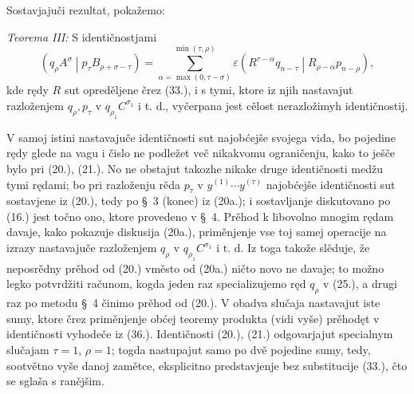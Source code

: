\documentclass[11pt]{article}
\newcommand{\pair}[2]{\left(#1\middle|#2\right)}
\newcommand{\eps}{\varepsilon}
\begin{document}
Sostavjajuči rezultat, pokažemo:

\emph{Teorema III:} S identičnostjami
\begin{equation}
 \pair{q_\rho A^\sigma}{p_\tau B_{\rho+\sigma-\tau}}
 =\sum_{\alpha=\max(0,\tau-\sigma)}^{\min(\tau,\rho)}
 \eps\pair{R^{\tau-\alpha}q_{n-\tau}}{R_{\rho-\alpha}p_{n-\rho}},
\tag{36}
\end{equation}
kde rędy $R$ sut opreděljene črez (33.), i s tymi, ktore iz njih nastavajut razloženjem $q_\rho,p_\tau$ v $q_{\rho_1}C^{\sigma_1}$ i t. d., vyčerpana jest cělost nerazložimyh identičnostij.

V samoj istini nastavajuče identičnosti sut najobćejše svojega vida, bo pojedine rędy glede na vagu i čislo ne podležet več nikakvomu ograničenju, kako to ješče bylo pri (20.), (21.). No ne obstajut takozhe nikake druge identičnosti medžu tymi rędami; bo pri razloženju rěda $p_\tau$ v $y^{(1)}\cdots y^{(\tau)}$ najobćejše identičnosti sut sostavjene iz (20.), tedy po \S\ 3 (konec) iz (20a.); i sostavljanje diskutovano po (16.) jest točno ono, ktore provedeno v \S\ 4. Prěhod k libovolno mnogim rędam davaje, kako pokazuje diskusija (20a.), priměnjenje vse toj samej operacije na izrazy nastavajuče razloženjem $q_\rho$ v $q_{\rho_1}C^{\sigma_1}$ i t. d. Iz toga takože slěduje, že neposrědny prěhod od (20.) vměsto od (20a.) ničto novo ne davaje; to možno legko potvrdžiti računom, kogda jeden raz specializujemo ręd $q_\rho$ v (25.), a drugi raz po metodu \S\ 4 činimo prěhod od (20.). V obadva slučaja nastavajut iste sumy, ktore črez priměnjenje obćej teoremy produkta (vidi vyše) prěhodęt v identičnosti vyhodeče iz (36.). Identičnosti (20.), (21.) odgovarjajut specialnym slučajam $\tau=1$, $\rho=1$; togda nastupajut samo po dvě pojedine sumy, tedy, sootvětno vyše danoj zamětce, eksplicitno predstavjenje bez substitucije (33.), čto se sglaša s ranějšim.
\end{document}
